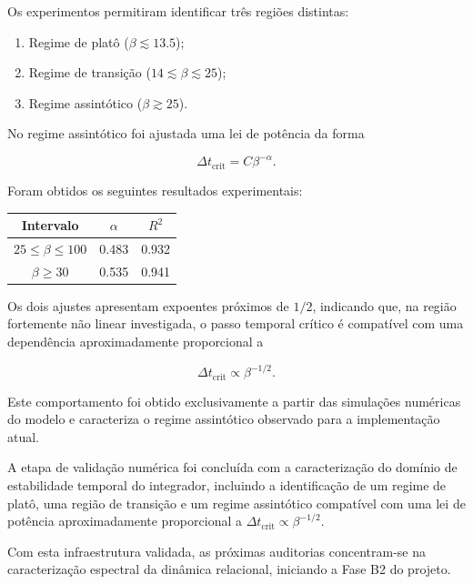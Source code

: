 \documentclass[11pt,a4paper]{article}
\begin{document}
Os experimentos permitiram identificar três regiões distintas:

\begin{enumerate}

\item Regime de platô ($\beta \lesssim 13.5$);

\item Regime de transição ($14 \lesssim \beta \lesssim 25$);

\item Regime assintótico ($\beta \gtrsim 25$).

\end{enumerate}

No regime assintótico foi ajustada uma lei de potência da forma

\[
\Delta t_{\mathrm{crit}}
=
C
\beta^{-\alpha}.
\]

Foram obtidos os seguintes resultados experimentais:

\begin{table}[h]
\centering
\begin{tabular}{ccc}
\toprule
Intervalo & $\alpha$ & $R^2$\\
\midrule
$25 \leq \beta \leq 100$ & 0.483 & 0.932\\
$\beta \geq 30$ & 0.535 & 0.941\\
\bottomrule
\end{tabular}
\end{table}

Os dois ajustes apresentam expoentes próximos de $1/2$, indicando que,
na região fortemente não linear investigada, o passo temporal crítico é
compatível com uma dependência aproximadamente proporcional a

\[
\Delta t_{\mathrm{crit}}
\propto
\beta^{-1/2}.
\]

Este comportamento foi obtido exclusivamente a partir das simulações
numéricas do modelo e caracteriza o regime assintótico observado para a
implementação atual.

A etapa de validação numérica foi concluída com a caracterização do
domínio de estabilidade temporal do integrador, incluindo a identificação
de um regime de platô, uma região de transição e um regime assintótico
compatível com uma lei de potência aproximadamente proporcional a
$\Delta t_{\mathrm{crit}}\propto\beta^{-1/2}$.

Com esta infraestrutura validada, as próximas auditorias concentram-se
na caracterização espectral da dinâmica relacional, iniciando a Fase B2
do projeto.
\end{document}
